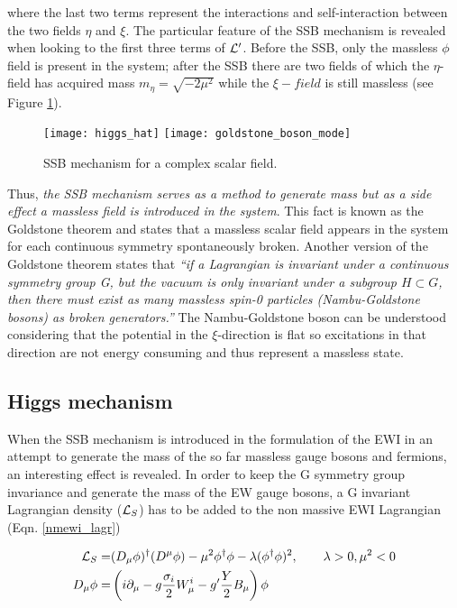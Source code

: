 \noindent where the last two terms represent the interactions and self-interaction between the two fields $\eta$ and $\xi$. The particular feature of the SSB mechanism is revealed when looking to the first three  terms of $\mathcal{L}'$. Before the SSB, only the massless $\phi$ field is present in the system; after the SSB there are two fields of which the $\eta$-field has acquired mass $m_\eta=\sqrt{-2\mu^2}$ while the $\xi-field$ is still massless (see Figure \ref{higgs_hat}).\\  

\begin{figure}[!h]
\centering
\texttt{[image: higgs\_hat]}
\texttt{[image: goldstone\_boson\_mode]}
\caption[SSB mechanism for complex scalar field]{SSB mechanism for a complex scalar field\cite{broken_symmetry,endres}.}
\label{higgs_hat}
\end{figure}

Thus, \textit {the SSB mechanism serves as a method to generate mass but as a side effect a massless field is introduced in the system}. This fact is known as the Goldstone theorem and states that a massless scalar field appears in the system for each continuous symmetry spontaneously broken. Another version of the Goldstone theorem states that \textit{``if a Lagrangian is invariant under a continuous symmetry group G, but the vacuum is only invariant under a subgroup $H\subset G$, then there must exist as many massless spin-0 particles (Nambu-Goldstone bosons) as broken generators.''}\cite{pich} The Nambu-Goldstone boson can be understood considering that the potential in the $\xi$-direction is flat so excitations in that direction are not energy consuming and thus represent a massless state.                   

\subsection{Higgs mechanism}

\noindent When the SSB mechanism is introduced in the formulation of the EWI in an attempt to generate the mass of the so far massless gauge bosons and fermions, an interesting effect is revealed. In order to keep the G symmetry group invariance and generate the mass of the EW gauge bosons, a G invariant Lagrangian density ($\mathcal{L}_S$) has to be added to the non massive EWI Lagrangian (Eqn. \ref{nmewi_lagr})

\begin{align}
\mathcal{L}_S    = &(D_\mu\phi)^\dagger(D^\mu\phi) - \mu^2\phi^\dagger\phi - \lambda(\phi^\dagger\phi)^2 , \qquad \lambda>0, \mu^2<0 \label{ls}\\
D_\mu\phi = &\left(i\partial_\mu - g\frac{\sigma_i}{2}W^i_\mu -
g'\frac{Y}{2}B_\mu\right)\phi
\end{align}

